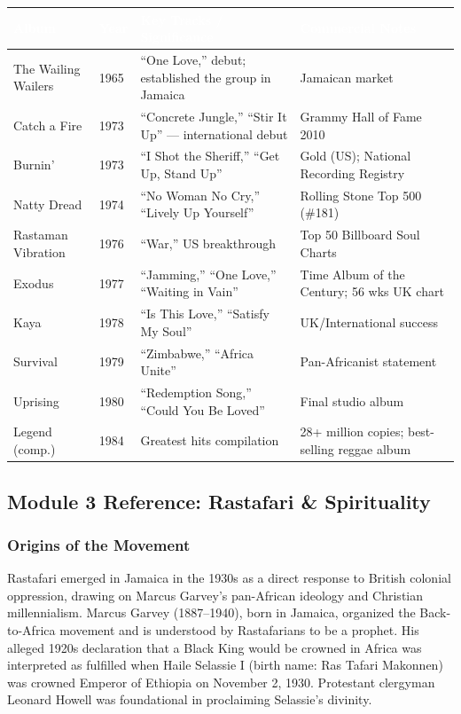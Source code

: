 \documentclass[11pt,letterpaper]{article}
\newcommand{\tableheader}[1]{\textbf{\sffamily\textcolor{white}{#1}}}
\begin{document}
\begin{center}
\begin{tabularx}{\textwidth}{L{2.5cm}L{2cm}XL{3cm}}
\toprule
{}
\tableheader{Album} & \tableheader{Year} & \tableheader{Key Tracks / Significance} & \tableheader{Commercial Notes} \\
\midrule
The Wailing Wailers & 1965 & ``One Love,'' debut; established the group in Jamaica & Jamaican market \\
Catch a Fire & 1973 & ``Concrete Jungle,'' ``Stir It Up'' --- international debut & Grammy Hall of Fame 2010 \\
Burnin' & 1973 & ``I Shot the Sheriff,'' ``Get Up, Stand Up'' & Gold (US); National Recording Registry \\
Natty Dread & 1974 & ``No Woman No Cry,'' ``Lively Up Yourself'' & Rolling Stone Top 500 (\#181) \\
Rastaman Vibration & 1976 & ``War,'' US breakthrough & Top 50 Billboard Soul Charts \\
Exodus & 1977 & ``Jamming,'' ``One Love,'' ``Waiting in Vain'' & Time Album of the Century; 56 wks UK chart \\
Kaya & 1978 & ``Is This Love,'' ``Satisfy My Soul'' & UK/International success \\
Survival & 1979 & ``Zimbabwe,'' ``Africa Unite'' & Pan-Africanist statement \\
Uprising & 1980 & ``Redemption Song,'' ``Could You Be Loved'' & Final studio album \\
Legend (comp.) & 1984 & Greatest hits compilation & 28+ million copies; best-selling reggae album \\
\bottomrule
\end{tabularx}
\end{center}

\subsection{Module 3 Reference: Rastafari \& Spirituality}

\subsubsection{Origins of the Movement}

Rastafari emerged in Jamaica in the 1930s as a direct response to British colonial oppression, drawing on Marcus Garvey's pan-African ideology and Christian millennialism. Marcus Garvey (1887--1940), born in Jamaica, organized the Back-to-Africa movement and is understood by Rastafarians to be a prophet. His alleged 1920s declaration that a Black King would be crowned in Africa was interpreted as fulfilled when Haile Selassie I (birth name: Ras Tafari Makonnen) was crowned Emperor of Ethiopia on November 2, 1930. Protestant clergyman Leonard Howell was foundational in proclaiming Selassie's divinity.
\end{document}
